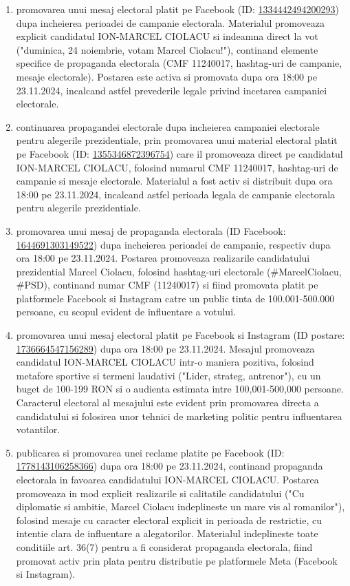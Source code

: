 \documentclass[a4paper,12pt]{article}
\begin{document}
\begin{enumerate}[leftmargin=*, label=\arabic*.)]
    \item promovarea unui mesaj electoral platit pe Facebook (ID: \href{https://www.facebook.com/ads/library/?id=1334442494200293}{1334442494200293}) dupa incheierea perioadei de campanie electorala. Materialul promoveaza explicit candidatul ION-MARCEL CIOLACU si indeamna direct la vot ("duminica, 24 noiembrie, votam Marcel Ciolacu!"), continand elemente specifice de propaganda electorala (CMF 11240017, hashtag-uri de campanie, mesaje electorale). Postarea este activa si promovata dupa ora 18:00 pe 23.11.2024, incalcand astfel prevederile legale privind incetarea campaniei electorale.
    \item continuarea propagandei electorale dupa incheierea campaniei electorale pentru alegerile prezidentiale, prin promovarea unui material electoral platit pe Facebook (ID: \href{https://www.facebook.com/ads/library/?id=1355346872396754}{1355346872396754}) care il promoveaza direct pe candidatul ION-MARCEL CIOLACU, folosind numarul CMF 11240017, hashtag-uri de campanie si mesaje electorale. Materialul a fost activ si distribuit dupa ora 18:00 pe 23.11.2024, incalcand astfel perioada legala de campanie electorala pentru alegerile prezidentiale.
    \item promovarea unui mesaj de propaganda electorala (ID Facebook: \href{https://www.facebook.com/ads/library/?id=1644691303149522}{1644691303149522}) dupa incheierea perioadei de campanie, respectiv dupa ora 18:00 pe 23.11.2024. Postarea promoveaza realizarile candidatului prezidential Marcel Ciolacu, folosind hashtag-uri electorale (\#MarcelCiolacu, \#PSD), continand numar CMF (11240017) si fiind promovata platit pe platformele Facebook si Instagram catre un public tinta de 100.001-500.000 persoane, cu scopul evident de influentare a votului.
    \item promovarea unui mesaj electoral platit pe Facebook si Instagram (ID postare: \href{https://www.facebook.com/ads/library/?id=1736664547156289}{1736664547156289}) dupa ora 18:00 pe 23.11.2024. Mesajul promoveaza candidatul ION-MARCEL CIOLACU intr-o maniera pozitiva, folosind metafore sportive si termeni laudativi ("Lider, strateg, antrenor"), cu un buget de 100-199 RON si o audienta estimata intre 100,001-500,000 persoane. Caracterul electoral al mesajului este evident prin promovarea directa a candidatului si folosirea unor tehnici de marketing politic pentru influentarea votantilor.
    \item publicarea si promovarea unei reclame platite pe Facebook (ID: \href{https://www.facebook.com/ads/library/?id=1778143106258366}{1778143106258366}) dupa ora 18:00 pe 23.11.2024, continand propaganda electorala in favoarea candidatului ION-MARCEL CIOLACU. Postarea promoveaza in mod explicit realizarile si calitatile candidatului ("Cu diplomatie si ambitie, Marcel Ciolacu indeplineste un mare vis al romanilor"), folosind mesaje cu caracter electoral explicit in perioada de restrictie, cu intentie clara de influentare a alegatorilor. Materialul indeplineste toate conditiile art. 36(7) pentru a fi considerat propaganda electorala, fiind promovat activ prin plata pentru distributie pe platformele Meta (Facebook si Instagram).

\end{enumerate}
\end{document}
